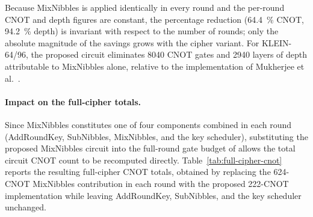 \begin{table}[htbp]
\centering
\footnotesize
{}
\caption{Cumulative MixNibbles CNOT count and depth across all rounds, by KLEIN variant.}
\label{tab:mixnibbles-full-cipher}
\end{table}

Because MixNibbles is applied identically in every round and the per-round CNOT and depth
figures are constant, the percentage reduction (\SI{64.4}{\percent} CNOT, \SI{94.2}{\percent}
depth) is invariant with respect to the number of rounds; only the absolute magnitude of the
savings grows with the cipher variant. For KLEIN-64/96, the proposed circuit eliminates
\num{8040} CNOT gates and \num{2940} layers of depth attributable to MixNibbles alone,
relative to the implementation of Mukherjee et al.~\cite{cryptoeprint:2026/1007}.

\paragraph{Impact on the full-cipher totals.}
Since MixNibbles constitutes one of four components combined in each round (AddRoundKey,
SubNibbles, MixNibbles, and the key scheduler), substituting the proposed MixNibbles circuit
into the full-round gate budget of \cite{cryptoeprint:2026/1007} allows the total circuit CNOT
count to be recomputed directly. Table~\ref{tab:full-cipher-cnot} reports the resulting
full-cipher CNOT totals, obtained by replacing the 624-CNOT MixNibbles contribution in each
round with the proposed 222-CNOT implementation while leaving AddRoundKey, SubNibbles, and
the key scheduler unchanged.

